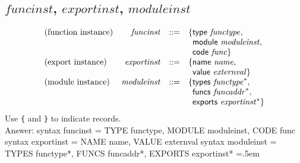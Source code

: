 \documentclass{article}
\newenvironment{lcverbatim}
 {\SaveVerbatim{cverb}}
 {\endSaveVerbatim
  \flushleft\fboxrule=0pt\fboxsep=.5em
  \colorbox{cverbbg}{%
    \makebox[\dimexpr\linewidth-2\fboxsep][l]{\BUseVerbatim{cverb}}%
  }
  \endflushleft
}
\newcommand\K[1]{\texttt{#1}}
\begin{document}
\subsection{$funcinst$, $exportinst$, $moduleinst$}
$$
\begin{array}{@{}lrrl@{}l@{}}
\mbox{(function instance)} & {\mathit{funcinst}} &::=& \{ \begin{array}[t]{@{}l@{}l@{}}
\mathsf{type}~{\mathit{functype}},\; \\
  \mathsf{module}~{\mathit{moduleinst}},\; \\
  \mathsf{code}~{\mathit{func}} \}\end{array} \\
\mbox{(export instance)} & {\mathit{exportinst}} &::=& \{ \begin{array}[t]{@{}l@{}l@{}}
\mathsf{name}~{\mathit{name}},\; \\
  \mathsf{value}~{\mathit{externval}} \}\end{array} \\
\mbox{(module instance)} & {\mathit{moduleinst}} &::=& \{ \begin{array}[t]{@{}l@{}l@{}}
\mathsf{types}~{{\mathit{functype}}^\ast},\; \\
  \mathsf{funcs}~{{\mathit{funcaddr}}^\ast},\; \\
  \mathsf{exports}~{{\mathit{exportinst}}^\ast} \}\end{array} \\
\end{array}
$$
Use \K{\{} and \K{\}} to indicate records. \\
{\color{red}
	Answer:
	\begin{lcverbatim}
syntax funcinst =
  { TYPE functype,
    MODULE moduleinst,
    CODE func }
syntax exportinst =
  { NAME name,
    VALUE externval }
syntax moduleinst =
  { TYPES functype*,
    FUNCS funcaddr*,
    EXPORTS exportinst* }
	\end{lcverbatim}
}
\end{document}
